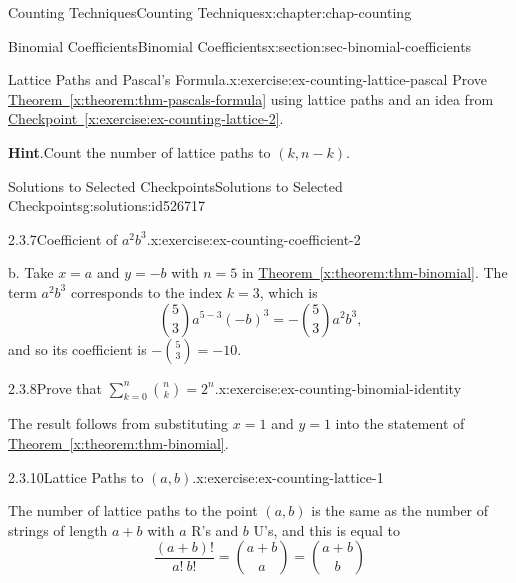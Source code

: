\documentclass[oneside,10pt,]{book}
\newcommand{\blocktitlefont}{\relax}
\newcommand{\xreffont}{\relax}
\numberwithin{equation}{section}
\begin{document}
\begin{chapterptx}{Counting Techniques}{}{Counting Techniques}{}{}{x:chapter:chap-counting}
\begin{sectionptx}{Binomial Coefficients}{}{Binomial Coefficients}{}{}{x:section:sec-binomial-coefficients}
\begin{inlineexercise}{Lattice Paths and Pascal's Formula.}{x:exercise:ex-counting-lattice-pascal}
Prove \hyperref[x:theorem:thm-pascals-formula]{Theorem~{\xreffont\ref{x:theorem:thm-pascals-formula}}} using lattice paths and an idea from \hyperref[x:exercise:ex-counting-lattice-2]{Checkpoint~{\xreffont\ref{x:exercise:ex-counting-lattice-2}}}.%
\par\smallskip%
\noindent\textbf{\blocktitlefont Hint}.\hypertarget{g:hint:id526685}{}\quad{}Count the number of lattice paths to \((k,n-k)\).%
\end{inlineexercise}%
%
%
\typeout{************************************************}
\typeout{************************************************}
%
\begin{solutions-subsection-numberless}{Solutions to Selected Checkpoints}{}{Solutions to Selected Checkpoints}{}{}{g:solutions:id526717}
\begin{inlinesolution}{2.3.7}{Coefficient of \(a^2b^3\).}{x:exercise:ex-counting-coefficient-2}%
\par\smallskip%
\noindent\hypertarget{g:solution:id526403-main}{}b. Take \(x = a\) and \(y = -b\) with \(n = 5\) in \hyperref[x:theorem:thm-binomial]{Theorem~{\xreffont\ref{x:theorem:thm-binomial}}}. The term \(a^2b^3\) corresponds to the index \(k = 3\), which is%
\begin{equation*}
\binom{5}{3}a^{5-3}(-b)^3 = -\binom{5}{3}a^2b^3\text{,}
\end{equation*}
and so its coefficient is \(-\displaystyle\binom{5}{3} = -10\).%
\end{inlinesolution}%
\begin{inlinesolution}{2.3.8}{Prove that \(\displaystyle\sum_{k=0}^n \binom{n}{k} = 2^n\).}{x:exercise:ex-counting-binomial-identity}%
\par\smallskip%
\noindent\hypertarget{g:solution:id526488-main}{}The result follows from substituting \(x = 1\) and \(y = 1\) into the statement of \hyperref[x:theorem:thm-binomial]{Theorem~{\xreffont\ref{x:theorem:thm-binomial}}}.%
\end{inlinesolution}%
\begin{inlinesolution}{2.3.10}{Lattice Paths to \((a,b)\).}{x:exercise:ex-counting-lattice-1}%
\par\smallskip%
\noindent\hypertarget{g:solution:id526617-main}{}The number of lattice paths to the point \((a,b)\) is the same as the number of strings of length \(a+b\) with \(a\) R's and \(b\) U's, and this is equal to%
\begin{equation*}
\dfrac{(a+b)!}{a! \ b!} = \binom{a+b}{a} = \binom{a+b}{b}

\end{equation*}
\end{inlinesolution}
\end{solutions-subsection-numberless}
\end{sectionptx}
\end{chapterptx}
\end{document}
